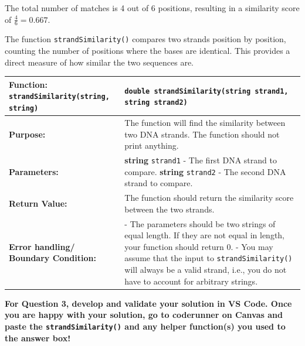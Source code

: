 The total number of matches is 4 out of 6 positions, resulting in a similarity score of \( \frac{4}{6} = 0.667 \).

\hspace{0pt}

The function \texttt{strandSimilarity()} compares two strands position by position, counting the number of positions where the bases are identical. This provides a direct measure of how similar the two sequences are.

\begin{longtable}{|p{1.7in}|p{4.0in}|}
    \hline
    \textbf{Function:} \texttt{strandSimilarity(string, string)}
        & 
        \texttt{double strandSimilarity(string strand1, string strand2)} 
        \\ \hline
    
    \textbf{Purpose:} 
        & 
        The function will find the similarity between two DNA strands. The function should not print anything.
        \\ \hline
    
    \textbf{Parameters:} 
        & 
        \textbf{string} \texttt{strand1} - The first DNA strand to compare. \newline
        \textbf{string} \texttt{strand2} - The second DNA strand to compare. 
        \\ \hline
    
    \textbf{Return Value:} 
        & 
        The function should return the similarity score between the two strands. 
        \\ \hline
    \textbf{Error handling/ Boundary Condition:}
        &
        - The parameters should be two strings of equal length. If they are not equal in length, your function should return 0. \newline
        - You may assume that the input to \texttt{strandSimilarity()} will always be a valid strand, i.e., you do not have to account for arbitrary strings.
    \\ \hline
\end{longtable}

\textbf{For Question 3, develop and validate your solution in VS Code. Once you are happy with your solution, go to coderunner on Canvas and paste the \texttt{strandSimilarity()} and any helper function(s) you used to the answer box!} 

